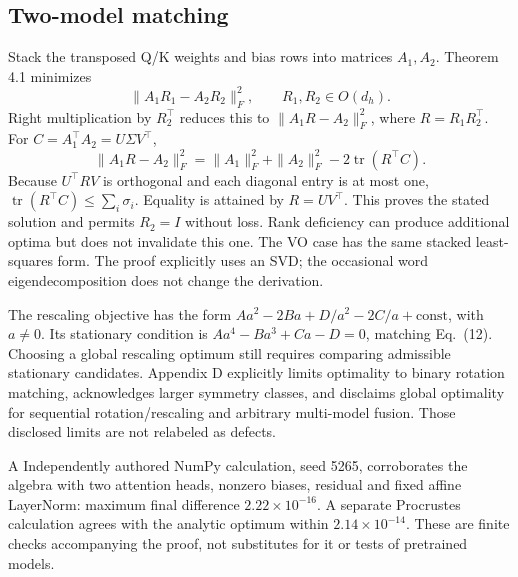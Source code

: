 \documentclass[10pt]{article}
\begin{document}
\subsection*{Two-model matching}
Stack the transposed Q/K weights and bias rows into matrices \(A_1,A_2\). Theorem 4.1 minimizes \[\|A_1R_1-A_2R_2\|_F^2,\qquad R_1,R_2\in O(d_h).\] Right multiplication by \(R_2^\top\) reduces this to \(\|A_1R-A_2\|_F^2\), where \(R=R_1R_2^\top\). For \(C=A_1^\top A_2=U\Sigma V^\top\), \[\|A_1R-A_2\|_F^2
=\|A_1\|_F^2+\|A_2\|_F^2-2\operatorname{tr}(R^\top C).\] Because \(U^\top RV\) is orthogonal and each diagonal entry is at most one, \(\operatorname{tr}(R^\top C)\le\sum_i\sigma_i\). Equality is attained by \(R=UV^\top\). This proves the stated solution and permits \(R_2=I\) without loss. Rank deficiency can produce additional optima but does not invalidate this one. The VO case has the same stacked least-squares form. The proof explicitly uses an SVD; the occasional word eigendecomposition does not change the derivation.\par
The rescaling objective has the form \(Aa^2-2Ba+D/a^2-2C/a+\mathrm{const}\), with \(a\ne0\). Its stationary condition is \(Aa^4-Ba^3+Ca-D=0\), matching Eq. (12). Choosing a global rescaling optimum still requires comparing admissible stationary candidates. Appendix D explicitly limits optimality to binary rotation matching, acknowledges larger symmetry classes, and disclaims global optimality for sequential rotation/rescaling and arbitrary multi-model fusion. Those disclosed limits are not relabeled as defects.\par
A Independently authored NumPy calculation, seed 5265, corroborates the algebra with two attention heads, nonzero biases, residual and fixed affine LayerNorm: maximum final difference \(2.22\times10^{-16}\). A separate Procrustes calculation agrees with the analytic optimum within \(2.14\times10^{-14}\). These are finite checks accompanying the proof, not substitutes for it or tests of pretrained models.\par
\end{document}
